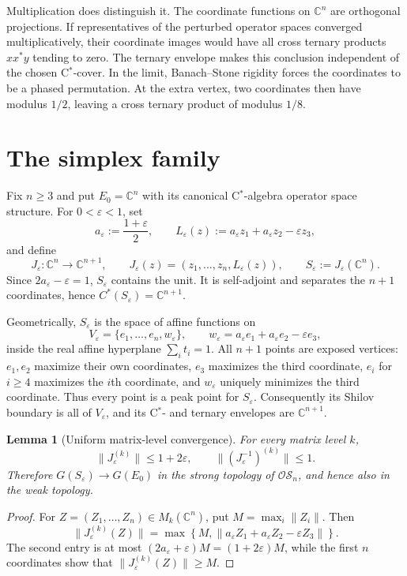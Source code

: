 \documentclass[11pt]{article}
\newtheorem{lemma}[theorem]{Lemma}
\newcommand{\C}{\mathbb C}
\newcommand{\OS}{\mathcal{OS}}
\newcommand{\eps}{\varepsilon}
\begin{document}
Multiplication does distinguish it. The coordinate functions on $\C^n$ are
orthogonal projections. If representatives of the perturbed operator spaces
converged multiplicatively, their coordinate images would have all cross
ternary products $xx^*y$ tending to zero. The ternary envelope makes this
conclusion independent of the chosen C$^*$-cover. In the limit, Banach--Stone
rigidity forces the coordinates to be a phased permutation. At the extra
vertex, two coordinates then have modulus $1/2$, leaving a cross ternary
product of modulus $1/8$.

\section{The simplex family}

Fix $n\geq3$ and put $E_0=\C^n$ with its canonical C$^*$-algebra operator
space structure. For $0<\eps<1$, set
\[
a_\eps:=\frac{1+\eps}{2},\qquad
L_\eps(z):=a_\eps z_1+a_\eps z_2-\eps z_3,
\]
and define
\[
J_\eps:\C^n\longrightarrow\C^{n+1},\qquad
J_\eps(z)=(z_1,\ldots,z_n,L_\eps(z)),
\qquad S_\eps:=J_\eps(\C^n).
\]
Since $2a_\eps-\eps=1$, $S_\eps$ contains the unit. It is self-adjoint and
separates the $n+1$ coordinates, hence $C^*(S_\eps)=\C^{n+1}$.

Geometrically, $S_\eps$ is the space of affine functions on
\[
V_\eps=\{e_1,\ldots,e_n,w_\eps\},\qquad
w_\eps=a_\eps e_1+a_\eps e_2-\eps e_3,
\]
inside the real affine hyperplane $\sum_i t_i=1$. All $n+1$ points are exposed
vertices: $e_1,e_2$ maximize their own coordinates, $e_3$ maximizes the third
coordinate, $e_i$ for $i\geq4$ maximizes the $i$th coordinate, and $w_\eps$
uniquely minimizes the third coordinate. Thus every point is a peak point for
$S_\eps$. Consequently its Shilov boundary is all of $V_\eps$, and its
C$^*$- and ternary envelopes are $\C^{n+1}$.

\begin{lemma}[Uniform matrix-level convergence]\label{lem:convergence}
For every matrix level $k$,
\[
\|J_\eps^{(k)}\|\leq1+2\eps,
\qquad \|(J_\eps^{-1})^{(k)}\|\leq1.
\]
Therefore $G(S_\eps)\to G(E_0)$ in the strong topology of $\OS_n$, and hence
also in the weak topology.
\end{lemma}

\begin{proof}
For $Z=(Z_1,\ldots,Z_n)\in M_k(\C^n)$, put
$M=\max_i\|Z_i\|$. Then
\[
\|J_\eps^{(k)}(Z)\|
=\max\left\{M,\|a_\eps Z_1+a_\eps Z_2-\eps Z_3\|\right\}.
\]
The second entry is at most
$(2a_\eps+\eps)M=(1+2\eps)M$, while the first $n$ coordinates show that
$\|J_\eps^{(k)}(Z)\|\geq M$.
\end{proof}
\end{document}

